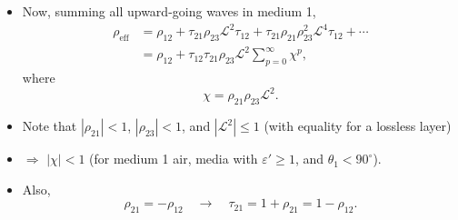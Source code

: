 \documentclass[11pt, oneside]{article}
\begin{document}
\begin{itemize}
	\item Now, summing all upward-going waves in medium 1,
	\begin{align}
		\rho_\mathrm{eff} &= \rho_{12} + \tau_{21}\rho_{23}\mathcal{L}^2\tau_{12} + \tau_{21}\rho_{21}\rho_{23}^2\mathcal{L}^4\tau_{12} + \cdots \nonumber\\
		&= \rho_{12} + \tau_{12}\tau_{21}\rho_{23}\mathcal{L}^2\sum_{p=0}^{\infty}\chi^p,
	\end{align}
	where
	\begin{equation}
		\chi = \rho_{21}\rho_{23}\mathcal{L}^2.
	\end{equation}
	\item Note that $|\rho_{21}| < 1$, $|\rho_{23}| < 1$, and $|\mathcal{L}^2| \le 1$ (with equality for a lossless layer)
	\item[] $\Rightarrow$ $|\chi| < 1$ (for medium 1 air, media with $\varepsilon' \ge 1$, and $\theta_1 < 90^\circ$).
	\item Also,
	\begin{equation}
		\rho_{21} = -\rho_{12} \quad\rightarrow\quad \tau_{21} = 1 + \rho_{21} = 1 - \rho_{12}.
	\end{equation}

\end{itemize}
\end{document}
